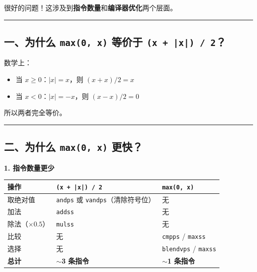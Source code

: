 \documentclass[11pt, a4paper]{article}
\begin{document}
\begin{aibox}
很好的问题！这涉及到\textbf{指令数量}和\textbf{编译器优化}两个层面。

\begin{center}\rule{\textwidth}{0.4pt}\end{center}

\subsection*{一、为什么 \texttt{max(0, x)} 等价于 \texttt{(x + |x|) / 2}？}

数学上：
\begin{itemize}
    \item 当 $x \ge 0$：$|x| = x$，则 $(x + x)/2 = x$
    \item 当 $x < 0$：$|x| = -x$，则 $(x - x)/2 = 0$
\end{itemize}

所以两者完全等价。

\begin{center}\rule{\textwidth}{0.4pt}\end{center}

\subsection*{二、为什么 \texttt{max(0, x)} 更快？}

\textbf{1. 指令数量更少}

\begin{tcolorbox}[colback=white,colframe=gray!50!white,boxrule=0.5pt,arc=2pt,left=5pt,right=5pt,top=5pt,bottom=5pt]
\vspace{0.5em}
\begin{tabularx}{\textwidth}{@{} l X X @{}}
\toprule
操作 & \texttt{(x + |x|) / 2} & \texttt{max(0, x)} \\
\midrule
取绝对值 & \texttt{andps} 或 \texttt{vandps}（清除符号位） & 无 \\
加法 & \texttt{addss} & 无 \\
除法（$\times 0.5$） & \texttt{mulss} & 无 \\
比较 & 无 & \texttt{cmpps} / \texttt{maxss} \\
选择 & 无 & \texttt{blendvps} / \texttt{maxss} \\
\midrule
\textbf{总计} & \textbf{$\sim$3 条指令} & \textbf{$\sim$1 条指令} \\
\bottomrule
\end{tabularx}
\vspace{0.5em}
\end{tcolorbox}


\end{aibox}
\end{document}
